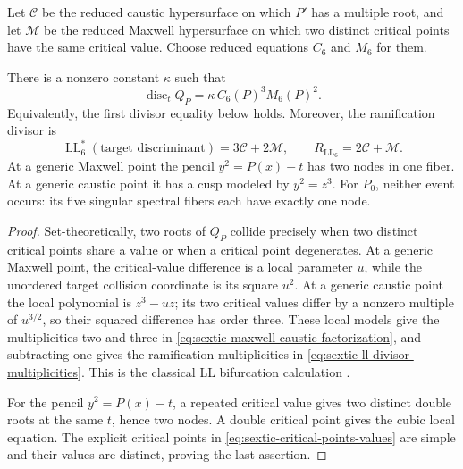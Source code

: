 Let $\mathcal C$ be the reduced caustic hypersurface on which $P'$ has a
multiple root, and let $\mathcal M$ be the reduced Maxwell hypersurface on
which two distinct critical points have the same critical value.  Choose
reduced equations $C_6$ and $M_6$ for them.

\begin{proposition}
\label{prop:sextic-double-discriminant}
There is a nonzero constant $\kappa$ such that
\begin{equation}
 \operatorname{disc}_tQ_P
 =\kappa\,C_6(P)^3M_6(P)^2.
 \label{eq:sextic-maxwell-caustic-factorization}
\end{equation}
Equivalently, the first divisor equality below holds.  Moreover, the
ramification divisor is
\begin{equation}
 \operatorname{LL}_6^*(\text{target discriminant})
 =3\mathcal C+2\mathcal M,
 \qquad
 R_{\operatorname{LL}_6}=2\mathcal C+\mathcal M.
 \label{eq:sextic-ll-divisor-multiplicities}
\end{equation}
At a generic Maxwell point the pencil $y^2=P(x)-t$ has two nodes in one
fiber.  At a generic caustic point it has a cusp modeled by $y^2=z^3$.
For $P_0$, neither event occurs: its five singular spectral fibers each have
exactly one node.
\end{proposition}

\begin{proof}
Set-theoretically, two roots of $Q_P$ collide precisely when two distinct
critical points share a value or when a critical point degenerates.  At a
generic Maxwell point, the critical-value difference is a local parameter
$u$, while the unordered target collision coordinate is its square $u^2$.
At a generic caustic point the local polynomial is $z^3-uz$; its two critical
values differ by a nonzero multiple of $u^{3/2}$, so their squared difference
has order three.  These local models give the multiplicities two and three in
\eqref{eq:sextic-maxwell-caustic-factorization}, and subtracting one gives the
ramification multiplicities in \eqref{eq:sextic-ll-divisor-multiplicities}.
This is the classical LL bifurcation calculation
\cite{Looijenga1974Bifurcation,Lyashko1984Bifurcation}.

For the pencil $y^2=P(x)-t$, a repeated critical value gives two distinct
double roots at the same $t$, hence two nodes.  A double critical point gives
the cubic local equation.  The explicit critical points in
\eqref{eq:sextic-critical-points-values} are simple and their values are
distinct, proving the last assertion.
\end{proof}

